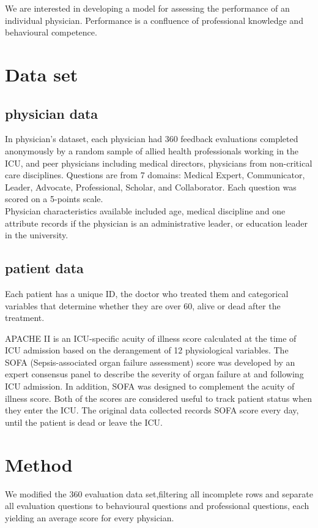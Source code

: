 \documentclass{article}
\begin{document}
  We are interested in developing a model for assessing the performance of an individual physician. Performance is a confluence of professional knowledge and behavioural competence. 

\section{Data set}

\subsection{physician data}
In physician's dataset, each physician had 360 feedback evaluations completed anonymously by a random sample of allied health professionals working in the ICU, and peer physicians including medical directors, physicians from non-critical care disciplines. Questions are from 7 domains: Medical Expert, Communicator, Leader, Advocate, Professional, Scholar, and Collaborator. Each question was scored on a 5-points scale.\\ 

Physician characteristics available included age, medical discipline and one attribute records if the physician is an administrative leader, or education leader in the university. \\

\subsection{patient data}

Each patient has a unique ID, the doctor who treated them and categorical variables that determine whether they are over 60, alive or dead after the treatment. 

APACHE II is an ICU-specific acuity of illness score calculated at the time of ICU admission based on the derangement of 12 physiological variables. The SOFA (Sepsis-associated organ failure assessment) score was developed by an expert consensus panel to describe the severity of organ failure at and following ICU admission. In addition, SOFA was designed to complement the acuity of illness score. \cite{Lambden} Both of the scores are considered useful to track patient status when they enter the ICU. The original data collected records SOFA score every day, until the patient is dead or leave the ICU. 


\section{Method}
We modified the 360 evaluation data set,filtering all incomplete rows and separate all evaluation questions to behavioural questions and professional questions, each yielding an average score for every physician. 
\end{document}
